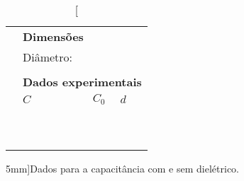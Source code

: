 \begin{table*}[!h]
\centering
\begin{tabular}{lp{25mm}p{25mm}p{25mm}l}
\toprule
	& \multicolumn{2}{l}{\textbf{Dimensões}} \\
	\cmidrule{2-3}
	& Diâmetro: \cellcolor[gray]{0.89} & \cellcolor[gray]{0.92} \\
	\cmidrule{2-3}
\\
	& \multicolumn{4}{l}{\textbf{Dados experimentais}} \\
	\cmidrule{2-4}
	& $C$ & $C_0$ & $d$ & \\
	\cmidrule{2-4}
	& \cellcolor[gray]{0.89} & \cellcolor[gray]{0.92} & \cellcolor[gray]{0.89} & \\
	& \cellcolor[gray]{0.95} & \cellcolor[gray]{0.97} & \cellcolor[gray]{0.95} & \\
	& \cellcolor[gray]{0.89} & \cellcolor[gray]{0.92} & \cellcolor[gray]{0.89} & \\
	& \cellcolor[gray]{0.95} & \cellcolor[gray]{0.97} & \cellcolor[gray]{0.95} & \\
	& \cellcolor[gray]{0.89} & \cellcolor[gray]{0.92} & \cellcolor[gray]{0.89} & \\
	& \cellcolor[gray]{0.95} & \cellcolor[gray]{0.97} & \cellcolor[gray]{0.95} & \\
	& \cellcolor[gray]{0.89} & \cellcolor[gray]{0.92} & \cellcolor[gray]{0.89} & \\
	& \cellcolor[gray]{0.95} & \cellcolor[gray]{0.97} & \cellcolor[gray]{0.95} & \\
	& \cellcolor[gray]{0.89} & \cellcolor[gray]{0.92} & \cellcolor[gray]{0.89} & \\
	& \cellcolor[gray]{0.95} & \cellcolor[gray]{0.97} & \cellcolor[gray]{0.95} & \\
	\cmidrule{2-4}
\bottomrule
\end{tabular}
\caption[][5mm]{Dados para a capacitância com e sem dielétrico.}
\label{Tab:ValoresCapacitancia}
\end{table*}

